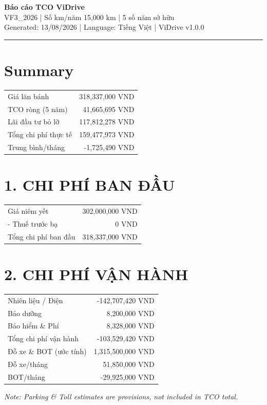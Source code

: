 \documentclass[11pt,a4paper]{article}
\begin{document}
\thispagestyle{empty}

\begin{center}
    {\LARGE \textbf{\color{ViDriveBlue} Báo cáo TCO ViDrive}}\\[0.3cm]
    {\Large VF3\_2026 | Số km/năm 15,000 km | 5 số năm sở hữu}\\[0.2cm]
    {\normalsize Generated: 13/08/2026 | Language: Tiếng Việt | ViDrive v1.0.0}
\end{center}
\vspace{0.5cm}
\hrule
\vspace{0.5cm}
\section*{Summary}
\begin{tabular}{l r}
\toprule
Giá lăn bánh & 318,337,000 VND \\
TCO ròng (5 năm) & 41,665,695 VND \\
Lãi đầu tư bỏ lỡ & 117,812,278 VND \\
Tổng chi phí thực tế & 159,477,973 VND \\
Trung bình/tháng & -1,725,490 VND \\
\bottomrule
\end{tabular}
\vspace{0.3cm}\section*{1. CHI PHÍ BAN ĐẦU}
\begin{tabular}{l r}
\toprule
Giá niêm yết & 302,000,000 VND \\
 - Thuế trước bạ & 0 VND \\
Tổng chi phí ban đầu & 318,337,000 VND \\
\bottomrule
\end{tabular}
\vspace{0.3cm}\section*{2. CHI PHÍ VẬN HÀNH}
\begin{tabular}{l r}
\toprule
Nhiên liệu / Điện & -142,707,420 VND \\
Bảo dưỡng & 8,200,000 VND \\
Bảo hiểm \& Phí & 8,328,000 VND \\
Tổng chi phí vận hành & -103,529,420 VND \\
Đỗ xe \& BOT (ước tính) & 1,315,500,000 VND \\
  Đỗ xe/tháng & 51,850,000 VND \\
  BOT/tháng & -29,925,000 VND \\
\bottomrule
\end{tabular}
\vspace{0.3cm}\textit{Note: Parking \& Toll estimates are provisions, not included in TCO total.}
\end{document}
